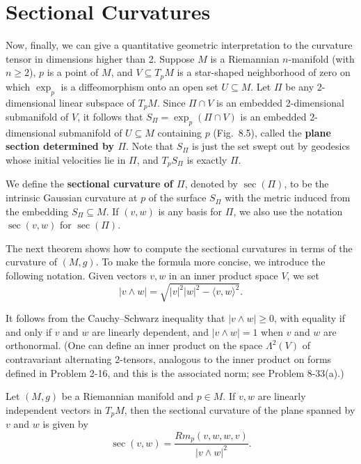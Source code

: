 \section{Sectional Curvatures}

Now, finally, we can give a quantitative geometric interpretation to the curvature tensor in dimensions higher than 2. Suppose $M$ is a Riemannian $n$-manifold (with $n \geq 2$), $p$ is a point of $M$, and $V \subseteq T_p M$ is a star-shaped neighborhood of zero on which $\exp_p$ is a diffeomorphism onto an open set $U \subseteq M$. Let $\Pi$ be any 2-dimensional linear subspace of $T_p M$. Since $\Pi \cap V$ is an embedded 2-dimensional submanifold of $V$, it follows that $S_\Pi = \exp_p(\Pi \cap V)$ is an embedded 2-dimensional submanifold of $U \subseteq M$ containing $p$ (Fig.\ 8.5), called the \textbf{plane section determined by $\Pi$}. Note that $S_\Pi$ is just the set swept out by geodesics whose initial velocities lie in $\Pi$, and $T_p S_\Pi$ is exactly $\Pi$.

We define the \textbf{sectional curvature of $\Pi$}, denoted by $\sec(\Pi)$, to be the intrinsic Gaussian curvature at $p$ of the surface $S_\Pi$ with the metric induced from the embedding $S_\Pi \subseteq M$. If $(v,w)$ is any basis for $\Pi$, we also use the notation $\sec(v,w)$ for $\sec(\Pi)$.

The next theorem shows how to compute the sectional curvatures in terms of the curvature of $(M,g)$. To make the formula more concise, we introduce the following notation. Given vectors $v, w$ in an inner product space $V$, we set
\begin{equation}
|v \wedge w| = \sqrt{|v|^2 |w|^2 - \langle v,w \rangle^2}.
\tag{8.27}
\end{equation}

It follows from the Cauchy--Schwarz inequality that $|v \wedge w| \geq 0$, with equality if and only if $v$ and $w$ are linearly dependent, and $|v \wedge w| = 1$ when $v$ and $w$ are orthonormal. (One can define an inner product on the space $\Lambda^2(V)$ of contravariant alternating 2-tensors, analogous to the inner product on forms defined in Problem 2-16, and this is the associated norm; see Problem 8-33(a).)

\begin{proposition}
\label{prop:sectional-curvature-formula}

Let $(M, g)$ be a Riemannian manifold and $p \in M$. If $v, w$ are linearly independent vectors in $T_p M$, then the sectional curvature of the plane spanned by $v$ and $w$ is given by
\[
\sec(v,w) = \frac{Rm_p(v,w,w,v)}{|v \wedge w|^2}.
\]
\end{proposition}

